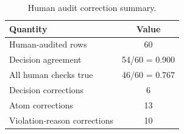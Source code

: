 \begin{table}[ht]
\centering
\small
\caption{Human audit correction summary.}
\label{tab:human-audit-summary}
\begin{tabular}{lc}
\toprule
Quantity & Value \\
\midrule
Human-audited rows & 60 \\
Decision agreement & 54/60 = 0.900 \\
All human checks true & 46/60 = 0.767 \\
Decision corrections & 6 \\
Atom corrections & 13 \\
Violation-reason corrections & 10 \\
\bottomrule
\end{tabular}
\end{table}
